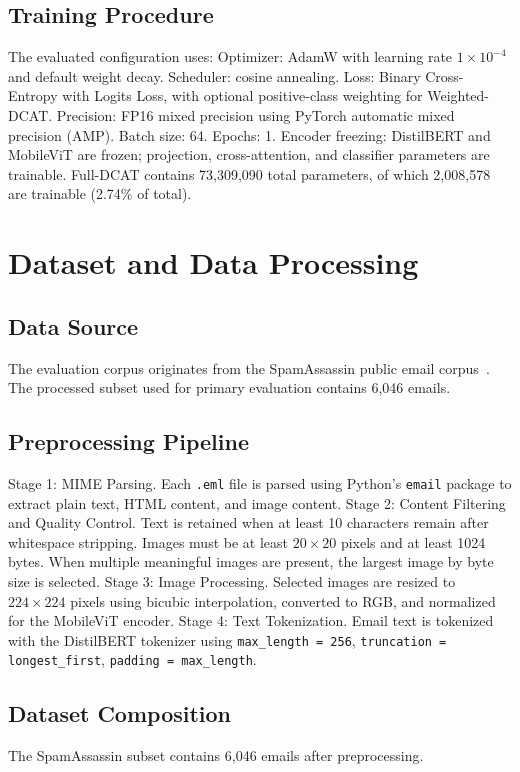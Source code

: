 \documentclass[conference]{IEEEtran}
\begin{document}
\subsection{Training Procedure}
The evaluated configuration uses:
Optimizer: AdamW with learning rate $1 \times 10^{-4}$ and default weight decay.
Scheduler: cosine annealing.
Loss: Binary Cross-Entropy with Logits Loss, with optional positive-class weighting for Weighted-DCAT.
Precision: FP16 mixed precision using PyTorch automatic mixed precision (AMP).
Batch size: 64. Epochs: 1.
Encoder freezing: DistilBERT and MobileViT are frozen; projection, cross-attention, and classifier parameters are trainable.
Full-DCAT contains 73,309,090 total parameters, of which 2,008,578 are trainable (2.74\% of total).

\section{Dataset and Data Processing}
\subsection{Data Source}
The evaluation corpus originates from the SpamAssassin public email corpus~\cite{ref1}. The processed subset used for primary evaluation contains 6,046 emails.
\subsection{Preprocessing Pipeline}
Stage 1: MIME Parsing. Each \texttt{.eml} file is parsed using Python's \texttt{email} package to extract plain text, HTML content, and image content.
Stage 2: Content Filtering and Quality Control. Text is retained when at least 10 characters remain after whitespace stripping. Images must be at least $20 \times 20$ pixels and at least 1024 bytes. When multiple meaningful images are present, the largest image by byte size is selected.
Stage 3: Image Processing. Selected images are resized to $224 \times 224$ pixels using bicubic interpolation, converted to RGB, and normalized for the MobileViT encoder.
Stage 4: Text Tokenization. Email text is tokenized with the DistilBERT tokenizer using \texttt{max\_length = 256}, \texttt{truncation = longest\_first}, \texttt{padding = max\_length}.
\subsection{Dataset Composition}
The SpamAssassin subset contains 6,046 emails after preprocessing.
\end{document}
